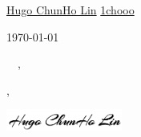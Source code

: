 \documentclass[12pt]{letter}
\begin{document}

\vspace{-4.0mm}

\begin{center}
{\fontsize{28}{0}\selectfont\scshape \myname}

\vspace{-1.0mm}

\href{mailto:\myemail}{\faEnvelope\enspace \myemail}\hfill
\href{https://www.linkedin.com/in/1chooo/}{\faLinkedinIn\enspace Hugo ChunHo Lin}\hfill
\href{tel:\myphone}{\faPhone\enspace \myphone}\hfill
\href{https://github.com/1chooo}{\faGithub\enspace 1chooo}
\end{center}


\vspace{0.2in}

\vspace{-5.0mm}

\today\\
\vspace{-4.0mm}


\vspace{-0.1in}\greeting\ \company  \recipient\ \commited,\\

\vspace{-4.0mm}

\vspace{-0.1in}\setlength\parindent{24pt}
\noindent

\vspace{0.1in}
\vfill

\begin{flushright}
\closer,

\vspace{-0.1in}\includegraphics[width=1.5in]{sig.png}\vspace{-0.1in}

\myname\\
\mytitle
\end{flushright}

% 
\end{document}
